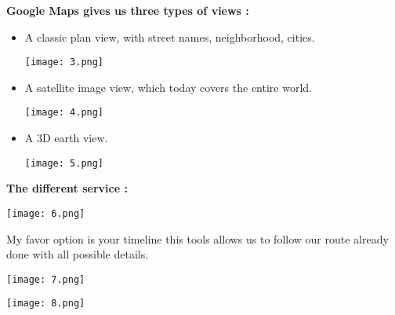 \documentclass[10pt,a4paper]{report}
\begin{document}
\textbf{Google Maps gives us three types of views :}
\begin{itemize}
\item A classic plan view, with street names, neighborhood, cities.
\begin{center}
	\texttt{[image: 3.png]}
\end{center}
\item A satellite image view, which today covers the entire world.
\begin{center}
	\texttt{[image: 4.png]}
\end{center}
\item A 3D earth view.
\begin{center}
	\texttt{[image: 5.png]}
\end{center}
\end{itemize}
\textbf{The different service :}
\begin{center}
	\texttt{[image: 6.png]}
\end{center}
My favor option is your timeline this tools allows us to follow our route already done with all possible details.
\begin{center}
	\begin{minipage}{0.4\textwidth}
		\begin{flushleft}
    			\texttt{[image: 7.png]}
		\end{flushleft}
	\end{minipage}
	\begin{minipage}{0.4\textwidth}
		\begin{flushright}
			\texttt{[image: 8.png]}
		\end{flushright}
	\end{minipage}
\end{center} 
\end{document}
